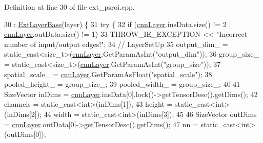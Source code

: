 Definition at line 30 of file ext\+\_\+psroi.\+cpp.


\begin{DoxyCode}
30                                                     : \hyperlink{classInferenceEngine_1_1Extensions_1_1Cpu_1_1ExtLayerBase_affff0e8263ca26852ccf71d299d7b06a}{ExtLayerBase}(layer) \{
31         \textcolor{keywordflow}{try} \{
32             \textcolor{keywordflow}{if} (\hyperlink{classInferenceEngine_1_1Extensions_1_1Cpu_1_1ExtLayerBase_a1074cdccacb9e9ca6eec01bbc2f7ca4a}{cnnLayer}.insData.size() != 2 || \hyperlink{classInferenceEngine_1_1Extensions_1_1Cpu_1_1ExtLayerBase_a1074cdccacb9e9ca6eec01bbc2f7ca4a}{cnnLayer}.outData.size() != 1)
33                 THROW\_IE\_EXCEPTION << \textcolor{stringliteral}{"Incorrect number of input/output edges!"};
34             \textcolor{comment}{// LayerSetUp}
35             output\_dim\_ = \textcolor{keyword}{static\_cast<}\textcolor{keywordtype}{size\_t}\textcolor{keyword}{>}(\hyperlink{classInferenceEngine_1_1Extensions_1_1Cpu_1_1ExtLayerBase_a1074cdccacb9e9ca6eec01bbc2f7ca4a}{cnnLayer}.GetParamAsInt(\textcolor{stringliteral}{"output\_dim"}));
36             group\_size\_ = \textcolor{keyword}{static\_cast<}\textcolor{keywordtype}{size\_t}\textcolor{keyword}{>}(\hyperlink{classInferenceEngine_1_1Extensions_1_1Cpu_1_1ExtLayerBase_a1074cdccacb9e9ca6eec01bbc2f7ca4a}{cnnLayer}.GetParamAsInt(\textcolor{stringliteral}{"group\_size"}));
37             spatial\_scale\_ = \hyperlink{classInferenceEngine_1_1Extensions_1_1Cpu_1_1ExtLayerBase_a1074cdccacb9e9ca6eec01bbc2f7ca4a}{cnnLayer}.GetParamAsFloat(\textcolor{stringliteral}{"spatial\_scale"});
38             pooled\_height\_ = group\_size\_;
39             pooled\_width\_ = group\_size\_;
40 
41             SizeVector inDims = \hyperlink{classInferenceEngine_1_1Extensions_1_1Cpu_1_1ExtLayerBase_a1074cdccacb9e9ca6eec01bbc2f7ca4a}{cnnLayer}.insData[0].lock()->getTensorDesc().getDims();
42             channels = \textcolor{keyword}{static\_cast<}\textcolor{keywordtype}{int}\textcolor{keyword}{>}(inDims[1]);
43             height = \textcolor{keyword}{static\_cast<}\textcolor{keywordtype}{int}\textcolor{keyword}{>}(inDims[2]);
44             width = \textcolor{keyword}{static\_cast<}\textcolor{keywordtype}{int}\textcolor{keyword}{>}(inDims[3]);
45 
46             SizeVector outDims = \hyperlink{classInferenceEngine_1_1Extensions_1_1Cpu_1_1ExtLayerBase_a1074cdccacb9e9ca6eec01bbc2f7ca4a}{cnnLayer}.outData[0]->getTensorDesc().getDims();
47             nn = \textcolor{keyword}{static\_cast<}\textcolor{keywordtype}{int}\textcolor{keyword}{>}(outDims[0]);

\end{DoxyCode}
